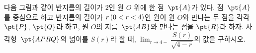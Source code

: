 다음 그림과 같이 반지름의 길이가 $2$인 원 $O$ 위에 한 점~$\pt{A}$가 있다. 점~$\pt{A}$를 중심으로 하고 반지름의 길이가 $r\mkern3mu (0<r<4)$인 원이 원 $O$와 만나는 두 점을 각각 $\pt{P}$, $\pt{Q}$라 하고, 원 $O$의 지름~$\pt{AB}$와 만나는 점을 $\pt{R}$라 하자. 사각형~$\pt{APRQ}$의 넓이를 $S(r)$라 할 때, $\displaystyle\lim_{r\to4-}\dfrac{S(r)}{\sqrt{4-r}}$의 값을 구하시오.
\par\smallskip\begin{center}\resizebox{\ifdim\width>\linewidth\linewidth\else\width\fi}{!}{}\end{center}
